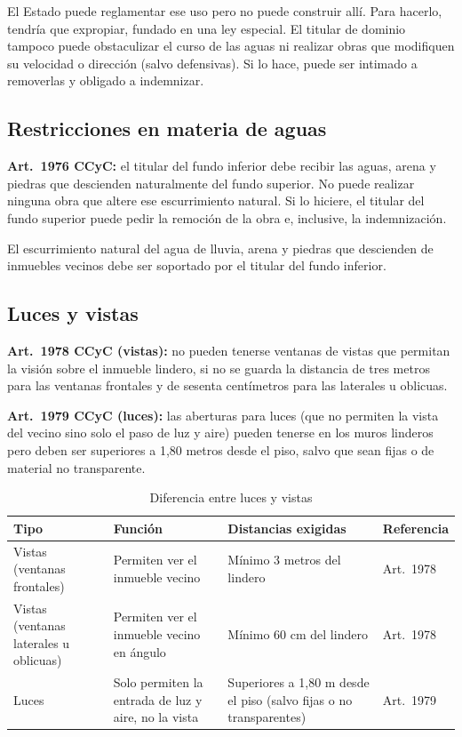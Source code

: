 \documentclass[12pt,oneside]{book}
\begin{document}
\begin{important}
El Estado puede reglamentar ese uso pero no puede construir allí. Para hacerlo, tendría que expropiar, fundado en una ley especial. El titular de dominio tampoco puede obstaculizar el curso de las aguas ni realizar obras que modifiquen su velocidad o dirección (salvo defensivas). Si lo hace, puede ser intimado a removerlas y obligado a indemnizar.
\end{important}

\subsection{Restricciones en materia de aguas}

\textbf{Art.~1976 CCyC:} el titular del fundo inferior debe recibir las aguas, arena y piedras que descienden naturalmente del fundo superior. No puede realizar ninguna obra que altere ese escurrimiento natural. Si lo hiciere, el titular del fundo superior puede pedir la remoción de la obra e, inclusive, la indemnización.

El escurrimiento natural del agua de lluvia, arena y piedras que descienden de inmuebles vecinos debe ser soportado por el titular del fundo inferior.

\subsection{Luces y vistas}

\textbf{Art.~1978 CCyC (vistas):} no pueden tenerse ventanas de vistas que permitan la visión sobre el inmueble lindero, si no se guarda la distancia de tres metros para las ventanas frontales y de sesenta centímetros para las laterales u oblicuas.

\textbf{Art.~1979 CCyC (luces):} las aberturas para luces (que no permiten la vista del vecino sino solo el paso de luz y aire) pueden tenerse en los muros linderos pero deben ser superiores a 1,80 metros desde el piso, salvo que sean fijas o de material no transparente.

\begin{table}[H]
\centering
\caption{Diferencia entre luces y vistas}
\small
\begin{tabularx}{\textwidth}{
    >{\raggedright\arraybackslash}p{}
    >{\raggedright\arraybackslash}p{}
    >{\raggedright\arraybackslash}X
    >{\raggedright\arraybackslash}p{}
}
\toprule
\textbf{Tipo} & \textbf{Función} & \textbf{Distancias exigidas} & \textbf{Referencia} \\
\midrule
Vistas (ventanas frontales) & Permiten ver el inmueble vecino & Mínimo 3 metros del lindero & Art.~1978 \\
Vistas (ventanas laterales u oblicuas) & Permiten ver el inmueble vecino en ángulo & Mínimo 60 cm del lindero & Art.~1978 \\
Luces & Solo permiten la entrada de luz y aire, no la vista & Superiores a 1,80 m desde el piso (salvo fijas o no transparentes) & Art.~1979 \\
\bottomrule
\end{tabularx}
\end{table}
\end{document}
